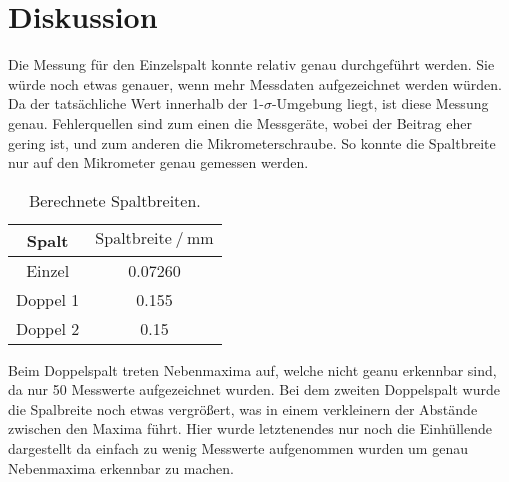 \section{Diskussion}
\label{sec:Diskussion}
Die Messung für den Einzelspalt konnte relativ genau durchgeführt werden.
Sie würde noch etwas genauer, wenn mehr Messdaten aufgezeichnet werden würden.
Da der tatsächliche Wert innerhalb der 1-$σ$-Umgebung liegt, ist diese Messung
genau. Fehlerquellen sind zum einen die Messgeräte, wobei der Beitrag eher
gering ist, und zum anderen die Mikrometerschraube. So konnte die Spaltbreite
nur auf den Mikrometer genau gemessen werden.

\begin{table}
  \centering
  \caption{Berechnete Spaltbreiten.}
  \label{tab:spaltbr}
  \begin{tabular}{S S[table-format=1.5]}
    \toprule
    {Spalt} & {$\text{Spaltbreite} \:/\: \si{\milli\meter}$} \\
    \midrule
    {Einzel}   & 0.07260 \\
    {Doppel 1} & 0.155 \\
    {Doppel 2} & 0.15 \\
    \bottomrule
  \end{tabular}
\end{table}

Beim Doppelspalt treten Nebenmaxima auf, welche nicht geanu erkennbar sind, da
nur 50 Messwerte aufgezeichnet wurden.
Bei dem zweiten Doppelspalt wurde die Spalbreite noch etwas vergrößert, was
in einem verkleinern der Abstände zwischen den Maxima führt. Hier wurde
letztenendes nur noch die Einhüllende dargestellt da einfach zu wenig
Messwerte aufgenommen wurden um genau Nebenmaxima erkennbar zu machen.
